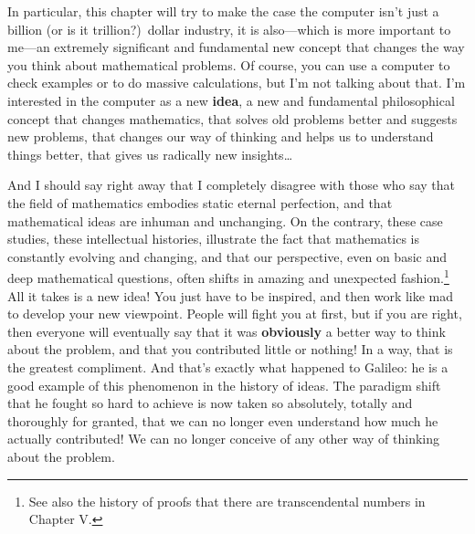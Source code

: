 \documentclass[12pt]{book}
\begin{document}
In particular, this chapter will try to make the case the computer isn't just a billion
(or is it trillion?)\ dollar industry, it is also---which is more important to me---an
extremely significant and fundamental new concept that changes the way you think about
mathematical problems.  Of course, you can use a computer to check examples or to do
massive calculations, but I'm not talking about that.  I'm interested in the computer as a new
\textbf{idea}, a new and fundamental philosophical concept that changes mathematics, that solves
old problems better and suggests new problems, that changes our way of thinking and helps us to
understand things better, that gives us radically new insights\ldots

And I should say right away that I completely disagree with those who say that the field
of mathematics embodies static eternal perfection, and that mathematical ideas are inhuman
and unchanging.  On the contrary, these case studies, these intellectual histories, illustrate
the fact that mathematics is constantly evolving and changing, and that our perspective,
even on basic and deep mathematical questions, often shifts in amazing and unexpected fashion.\footnote
{See also the history of proofs that there are transcendental numbers in Chapter V.}
All it takes is a new idea!  You just have to be inspired, and then work like mad to develop
your new viewpoint. People will fight you at first, but if you are right, then everyone
will eventually say that it was \textbf{obviously} a better way to think about the problem, and
that you contributed little or nothing! In a way, that is the greatest compliment. And that's
exactly what happened to Galileo: he is a good example of this phenomenon in the history of ideas.  
The paradigm shift that he fought so hard to achieve is now taken so absolutely, totally and
thoroughly for granted, that we can no longer even understand how much he actually contributed!
We can no longer conceive of any other way of thinking about the problem.
\end{document}
